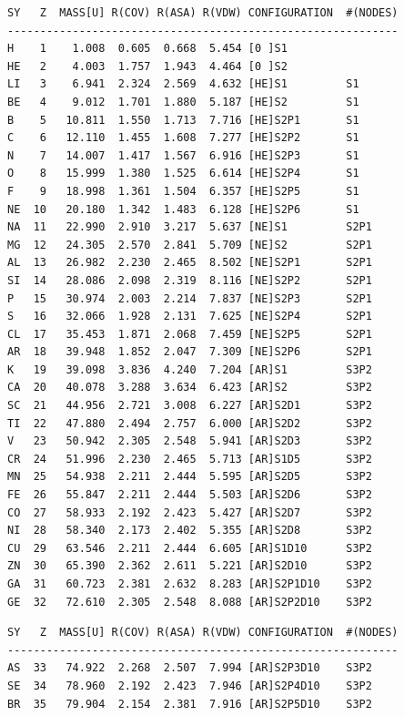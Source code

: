 \documentclass[final,12pt,makeidx,DIV=calc]{article}
\begin{document}
{{{\small
\begin{verbatim}
SY   Z  MASS[U] R(COV) R(ASA) R(VDW) CONFIGURATION  #(NODES)
------------------------------------------------------------
H    1    1.008  0.605  0.668  5.454 [0 ]S1                   
HE   2    4.003  1.757  1.943  4.464 [0 ]S2                   
LI   3    6.941  2.324  2.569  4.632 [HE]S1         S1        
BE   4    9.012  1.701  1.880  5.187 [HE]S2         S1        
B    5   10.811  1.550  1.713  7.716 [HE]S2P1       S1        
C    6   12.110  1.455  1.608  7.277 [HE]S2P2       S1        
N    7   14.007  1.417  1.567  6.916 [HE]S2P3       S1        
O    8   15.999  1.380  1.525  6.614 [HE]S2P4       S1        
F    9   18.998  1.361  1.504  6.357 [HE]S2P5       S1        
NE  10   20.180  1.342  1.483  6.128 [HE]S2P6       S1        
NA  11   22.990  2.910  3.217  5.637 [NE]S1         S2P1      
MG  12   24.305  2.570  2.841  5.709 [NE]S2         S2P1      
AL  13   26.982  2.230  2.465  8.502 [NE]S2P1       S2P1      
SI  14   28.086  2.098  2.319  8.116 [NE]S2P2       S2P1      
P   15   30.974  2.003  2.214  7.837 [NE]S2P3       S2P1      
S   16   32.066  1.928  2.131  7.625 [NE]S2P4       S2P1      
CL  17   35.453  1.871  2.068  7.459 [NE]S2P5       S2P1      
AR  18   39.948  1.852  2.047  7.309 [NE]S2P6       S2P1      
K   19   39.098  3.836  4.240  7.204 [AR]S1         S3P2      
CA  20   40.078  3.288  3.634  6.423 [AR]S2         S3P2      
SC  21   44.956  2.721  3.008  6.227 [AR]S2D1       S3P2      
TI  22   47.880  2.494  2.757  6.000 [AR]S2D2       S3P2      
V   23   50.942  2.305  2.548  5.941 [AR]S2D3       S3P2      
CR  24   51.996  2.230  2.465  5.713 [AR]S1D5       S3P2      
MN  25   54.938  2.211  2.444  5.595 [AR]S2D5       S3P2      
FE  26   55.847  2.211  2.444  5.503 [AR]S2D6       S3P2      
CO  27   58.933  2.192  2.423  5.427 [AR]S2D7       S3P2      
NI  28   58.340  2.173  2.402  5.355 [AR]S2D8       S3P2      
CU  29   63.546  2.211  2.444  6.605 [AR]S1D10      S3P2      
ZN  30   65.390  2.362  2.611  5.221 [AR]S2D10      S3P2      
GA  31   60.723  2.381  2.632  8.283 [AR]S2P1D10    S3P2      
GE  32   72.610  2.305  2.548  8.088 [AR]S2P2D10    S3P2      
\end{verbatim}
\newpage
\begin{verbatim}
SY   Z  MASS[U] R(COV) R(ASA) R(VDW) CONFIGURATION  #(NODES)
------------------------------------------------------------
AS  33   74.922  2.268  2.507  7.994 [AR]S2P3D10    S3P2      
SE  34   78.960  2.192  2.423  7.946 [AR]S2P4D10    S3P2      
BR  35   79.904  2.154  2.381  7.916 [AR]S2P5D10    S3P2      

\end{verbatim}}}}
\end{document}
